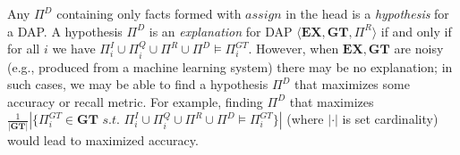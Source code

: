 Any $\Pi^D$ containing only facts formed with $assign$ in the head is a {\em hypothesis} for a DAP.  
A hypothesis $\Pi^D$ is an \textit{explanation} for DAP $\langle \mathbf{EX},\mathbf{GT},\Pi^{R} \rangle$ if and only if for all $i$ we have $\Pi^{I}_i\cup\Pi^{Q}_i\cup\Pi^{R}\cup\Pi^D \models  \Pi^{GT}_i$.  
However, when $\mathbf{EX},\mathbf{GT}$ are noisy (e.g., produced from a machine learning system) there may be no explanation; in such cases, we may be able to find a hypothesis $\Pi^D$ that maximizes some accuracy or recall metric.
For example, finding $\Pi^D$ that maximizes $\frac{1}{|\mathbf{GT}|} |\{\Pi^{GT}_i \in \mathbf{GT} \textit{ s.t. } \Pi^{I}_i\cup\Pi^{Q}_i\cup\Pi^{R}\cup\Pi^D \models  \Pi^{GT}_i\}|$ (where $|\cdot|$ is set cardinality) would lead to maximized accuracy.





